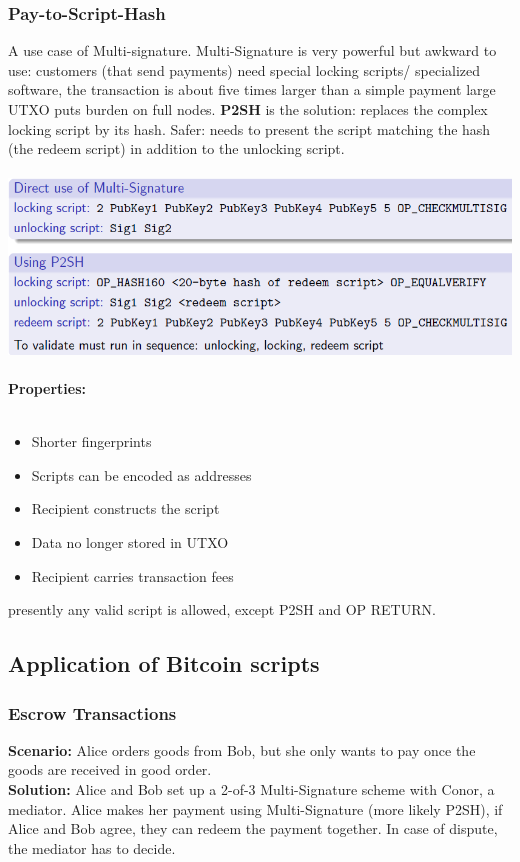 \documentclass{article}
\begin{document}
\subsubsection{Pay-to-Script-Hash}
A use case of Multi-signature. Multi-Signature is very powerful but awkward to use: customers (that send payments) need special locking scripts/ specialized software, the transaction is about five times larger than a simple payment large UTXO puts burden on full nodes.
\textbf{P2SH} is the solution: replaces the complex locking script by its hash. Safer: needs to present the script matching the hash (the redeem script) in addition to the unlocking script.\\\\
\includegraphics[scale=0.6]{25.png}\\\\
\textbf{Properties: }\\\\
\begin{itemize}
\item Shorter fingerprints
\item Scripts can be encoded as addresses
\item Recipient constructs the script
\item Data no longer stored in UTXO
\item Recipient carries transaction fees
\end{itemize}

presently any valid script is allowed, except P2SH and OP RETURN.
\subsection{Application of Bitcoin scripts}
\subsubsection{Escrow Transactions}
\textbf{Scenario: }Alice orders goods from Bob, but she only wants to pay once the goods are received in good order.\\
\textbf{Solution: }Alice and Bob set up a 2-of-3 Multi-Signature scheme with Conor, a mediator. Alice makes her payment using Multi-Signature (more likely P2SH), if Alice and Bob agree, they can redeem the payment together. In case of dispute, the mediator has to decide.
\end{document}
